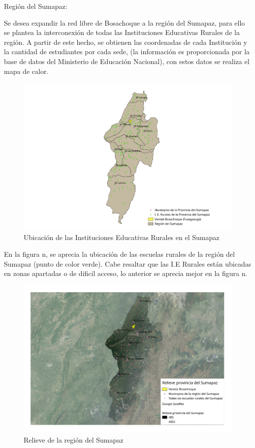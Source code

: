 \documentclass[]{article}
\begin{document}
Región del Sumapaz:

Se desea expandir la red libre de Bosachoque a la región del Sumapaz,
para ello se plantea la interconexión de todas las Instituciones
Educativas Rurales de la región. A partir de este hecho, se obtienen las
coordenadas de cada Institución y la cantidad de estudiantes por cada
sede, (la información es proporcionada por la base de datos del
Ministerio de Educación Nacional), con estos datos se realiza el mapa de
calor.

\begin{figure}
\centering
\includegraphics{Ubicacion_IE_Rurales.pdf}
\caption{Ubicación de las Instituciones Educativas Rurales en el
Sumapaz}
\end{figure}

En la figura n, se aprecia la ubicación de las escuelas rurales de la
región del Sumapaz (punto de color verde). Cabe resaltar que las I.E
Rurales están ubicadas en zonas apartadas o de dificil acceso, lo
anterior se aprecia mejor en la figura n.

\begin{figure}
\centering
\includegraphics{relieve_sumapaz_escuela.pdf}
\caption{Relieve de la región del Sumapaz}
\end{figure}
\end{document}
